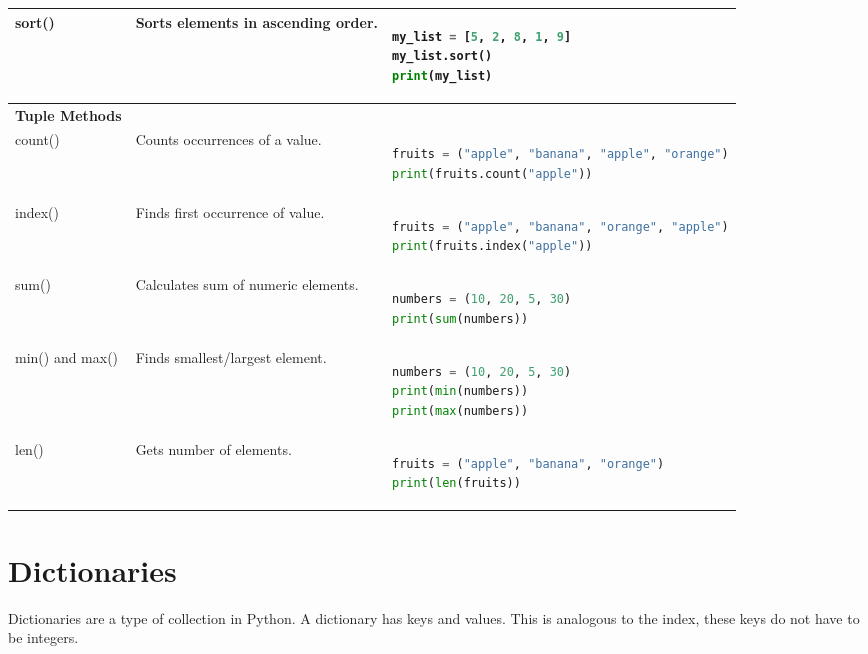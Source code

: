 \documentclass[../../data_analysis_python.tex]{subfiles}
\begin{document}
\begin{longtable}{p{} p{} p{}}
    sort() & Sorts elements in ascending order. & 
    \begin{lstlisting}[language=Python]
my_list = [5, 2, 8, 1, 9]
my_list.sort()
print(my_list)
    \end{lstlisting} \\
    \hline
    
    \textbf{Tuple Methods} & & \\
    \hline
    
    count() & Counts occurrences of a value. & 
    \begin{lstlisting}[language=Python]
fruits = ("apple", "banana", "apple", "orange")
print(fruits.count("apple"))
    \end{lstlisting} \\
    \hline
    
    index() & Finds first occurrence of value. & 
    \begin{lstlisting}[language=Python]
fruits = ("apple", "banana", "orange", "apple")
print(fruits.index("apple"))
    \end{lstlisting} \\
    \hline
    
    sum() & Calculates sum of numeric elements. & 
    \begin{lstlisting}[language=Python]
numbers = (10, 20, 5, 30)
print(sum(numbers))
    \end{lstlisting} \\
    \hline
    
    min() and max() & Finds smallest/largest element. & 
    \begin{lstlisting}[language=Python]
numbers = (10, 20, 5, 30)
print(min(numbers))
print(max(numbers))
    \end{lstlisting} \\
    \hline
    
    len() & Gets number of elements. & 
    \begin{lstlisting}[language=Python]
fruits = ("apple", "banana", "orange")
print(len(fruits))
    \end{lstlisting} \\
    
\end{longtable}

    \section{Dictionaries}

    Dictionaries are a type of collection in Python. A dictionary has keys and values. This is analogous to the index, these keys do not have to be integers.
\end{document}
